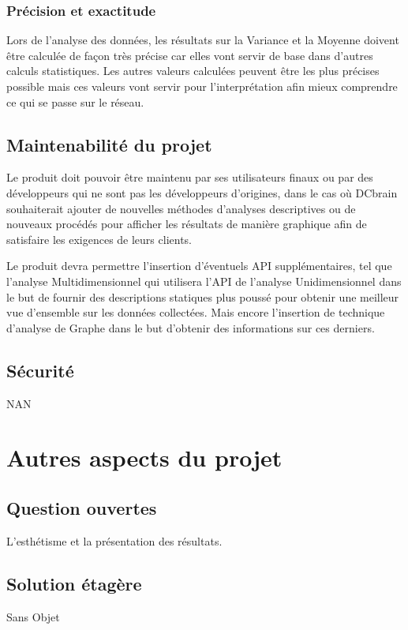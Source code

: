 			\subsubsection{Précision et exactitude}
			Lors de l'analyse des données, les résultats sur la Variance et la Moyenne doivent être calculée de façon très précise car elles vont servir de base dans d’autres calculs statistiques. Les autres valeurs calculées peuvent être les plus précises possible mais ces valeurs vont servir pour l'interprétation afin mieux comprendre ce qui se passe sur le réseau.

		\subsection{Maintenabilité du projet}
		Le produit doit pouvoir être maintenu par ses utilisateurs finaux ou par des développeurs qui ne sont pas les développeurs d’origines, dans le cas où DCbrain souhaiterait ajouter de nouvelles méthodes d’analyses descriptives ou de nouveaux procédés pour afficher les résultats de manière graphique afin de satisfaire les exigences de leurs clients.\newline
		
		Le produit devra permettre l'insertion d'éventuels API supplémentaires, tel que l'analyse Multidimensionnel qui utilisera l'API de l'analyse Unidimensionnel dans le but de fournir des descriptions statiques plus poussé pour obtenir une meilleur vue d'ensemble sur les données collectées. Mais encore l'insertion de technique d'analyse de Graphe dans le but d'obtenir des informations sur ces derniers.
		
		\subsection{Sécurité} 
		NAN
		
	\section{Autres aspects du projet}
		\subsection{Question ouvertes}
			L'esthétisme et la présentation des résultats.
			
		\subsection{Solution étagère}
			Sans Objet
			
